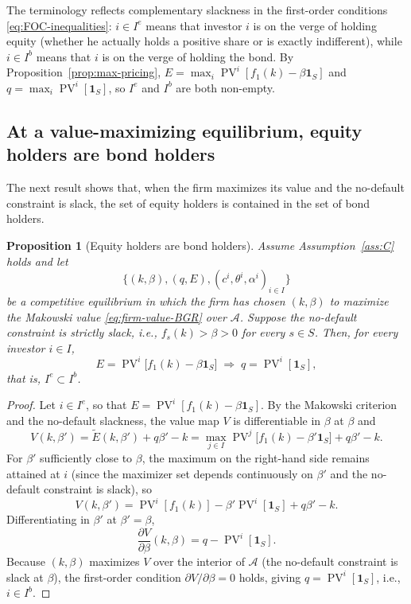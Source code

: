 \documentclass[11pt,a4paper,oneside]{book}
\def\1{\mathbf{1}}
\DeclareMathOperator{\PV}{PV}
\theoremstyle{plain}
\newtheorem{proposition}[theorem]{Proposition}
\theoremstyle{definition}
\theoremstyle{remark}
\numberwithin{equation}{chapter}
\begin{document}
The terminology reflects complementary slackness in the first-order conditions \eqref{eq:FOC-inequalities}: $i \in I^e$ means that investor $i$ is on the verge of holding equity (whether he actually holds a positive share or is exactly indifferent), while $i \in I^b$ means that $i$ is on the verge of holding the bond.
By Proposition~\ref{prop:max-pricing}, $E = \max_i \PV^i[f_1(k) - \beta \1_S]$ and $q = \max_i \PV^i[\1_S]$, so $I^e$ and $I^b$ are both non-empty.

\subsection{At a value-maximizing equilibrium, equity holders are bond holders}

The next result shows that, when the firm maximizes its value and the no-default constraint is slack, the set of equity holders is contained in the set of bond holders.

\begin{proposition}[Equity holders are bond holders]\label{prop:eh-are-bh}
Assume Assumption~\ref{ass:C} holds and let
\begin{equation*}
  \bigl\{ (k, \beta), (q, E), (c^i, \theta^i, \alpha^i)_{i \in I} \bigr\}
\end{equation*}
be a competitive equilibrium in which the firm has chosen $(k, \beta)$ to maximize the Makowski value \eqref{eq:firm-value-BGR} over $\mathcal{A}$.
Suppose the no-default constraint is strictly slack, i.e., $f_s(k) > \beta > 0$ for every $s \in S$.
Then, for every investor $i \in I$,
\begin{equation*}
  E = \PV^i\bigl[ f_1(k) - \beta \1_S \bigr]
  \;\Longrightarrow\;
  q = \PV^i[\1_S],
\end{equation*}
that is, $I^e \subset I^b$.
\end{proposition}

\begin{proof}
Let $i \in I^e$, so that $E = \PV^i[f_1(k) - \beta \1_S]$.
By the Makowski criterion and the no-default slackness, the value map $V$ is differentiable in $\beta$ at $\beta$ and
\begin{equation*}
  V(k, \beta') = \widetilde{E}(k, \beta') + q \beta' - k
  = \max_{j \in I} \PV^j\bigl[ f_1(k) - \beta' \1_S \bigr] + q \beta' - k.
\end{equation*}
For $\beta'$ sufficiently close to $\beta$, the maximum on the right-hand side remains attained at $i$ (since the maximizer set depends continuously on $\beta'$ and the no-default constraint is slack), so
\begin{equation*}
  V(k, \beta') = \PV^i[f_1(k)] - \beta' \PV^i[\1_S] + q \beta' - k.
\end{equation*}
Differentiating in $\beta'$ at $\beta' = \beta$,
\begin{equation*}
  \frac{\partial V}{\partial \beta}(k, \beta)
  = q - \PV^i[\1_S].
\end{equation*}
Because $(k, \beta)$ maximizes $V$ over the interior of $\mathcal{A}$ (the no-default constraint is slack at $\beta$), the first-order condition $\partial V / \partial \beta = 0$ holds, giving $q = \PV^i[\1_S]$, i.e., $i \in I^b$.
\end{proof}
\end{document}
